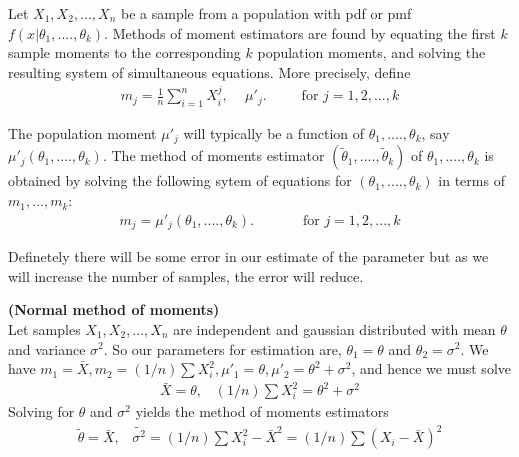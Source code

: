 \documentclass[a4paper,english,12pt]{article}
\begin{document}
Let $X_1,X_2,...,X_n$ be a sample from a population with pdf or pmf $f(x|\theta_1,....,\theta_k)$. Methods of moment estimators are found by equating the first $k$ sample moments to the corresponding $k$ population moments, and solving the resulting system of simultaneous equations. More precisely, define
\begin{align}
 m_j = \frac{1}{n}\sum\limits_{i=1}^n{X^j_i}, \,\,\,\,\,\,\,\mu'_j.\,\,\,\,\,\,\,\,\,\,\,\,\,\,\,\mathrm{for}\,\, j = 1,2,...,k
\end{align}  

The population moment $\mu'_j$ will typically be a function of $\theta_1,....,\theta_k$, say $\mu'_j(\theta_1,....,\theta_k)$. The method of moments estimator $(\tilde\theta_1,....,\tilde\theta_k)$ of $\theta_1,....,\theta_k$ is obtained by solving the following sytem of equations for $(\theta_1,....,\theta_k)$ in terms of $m_1,...,m_k$:
\begin{align}
m_j = \mu'_j(\theta_1,....,\theta_k). \,\,\,\,\,\,\,\,\,\,\,\,\,\,\,\,\,\,\,\,\,\mathrm{for}\,\, j = 1,2,...,k
\end{align} 

Definetely there will be some error in our estimate of the parameter but as we will increase the number of samples, the error will reduce.

\begin{exmp}\textbf{(Normal method of moments)}\\
Let samples $X_1,X_2,...,X_n$ are independent and gaussian distributed with mean $\theta$ and variance $\sigma^2$. So our parameters for estimation are, $\theta_1=\theta$ and $\theta_2=\sigma^2$. We have $m_1 = \bar{X}, m_2 = (1/n)\sum{X^2_i}, \mu'_1=\theta, \mu'_2 = \theta^2 + \sigma^2 $, and hence we must solve 
\begin{align}
\bar{X}=\theta,\,\,\,\,\,(1/n)\sum{X^2_i} = \theta^2 + \sigma^2
\end{align} 
Solving for $\theta$ and $\sigma^2$ yields the method of moments estimators
\begin{align}
\tilde{\theta} = \bar{X},\,\,\,\,\,\tilde{\sigma^2}=(1/n)\sum{X^2_i} - \bar{X}^2=(1/n)\sum{(X_i - \bar{X})}^2
\end{align} 
\end{exmp}
\end{document}
